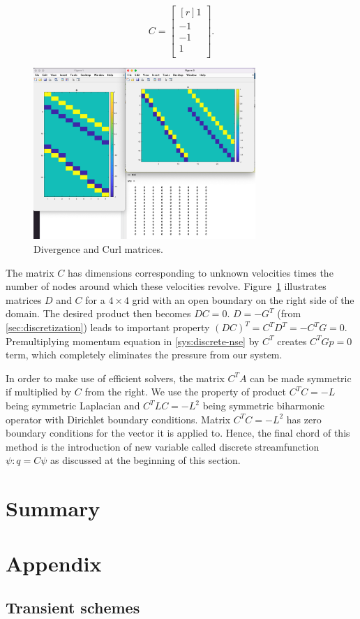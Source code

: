\documentclass{article}
\numberwithin{equation}{section}
\begin{document}
\begin{equation*}
  C = 
  \begin{bmatrix*}[r]
  1		\\
  -1	\\
  -1	\\
  1		\\
\end{bmatrix*}.
\end{equation*}

\begin{figure}[H]
\begin{center}
  \includegraphics[width=0.75\textwidth]{Figures/D-C-DC}
\end{center}
\caption{Divergence and Curl matrices.}
\label{fig:DC}
\end{figure}
The matrix $C$ has dimensions corresponding to unknown velocities times the number of nodes around which these velocities revolve. 
	Figure~\ref{fig:DC} illustrates matrices $D$ and $C$ for a $4\times4$ grid with an open boundary on the right side of the domain. 
The desired product then becomes $DC=0$. 
	$D=-G^T$ (from \cref{sec:discretization}) leads to important property $(DC)^T=C^TD^T=-C^TG=0$. 
	Premultiplying momentum equation in \cref{sys:discrete-nse} by $C^T$ creates $C^TGp=0$ term, which completely eliminates the pressure from our system.

In order to make use of efficient solvers, the matrix $C^TA$ can be made symmetric if multiplied by $C$ from the right. 
	We use the property of product $C^TC=-L$ being symmetric Laplacian and $C^TLC=-L^2$ being symmetric biharmonic operator with Dirichlet boundary conditions. 
	Matrix $C^TC=-L^2$ has zero boundary conditions for the vector it is applied to.
	Hence, the final chord of this method is the introduction of new variable called discrete streamfunction $\psi:q=C\psi$ as discussed at the beginning of this section.


	
\section{Summary}\label{sec:summary}
	

\pagebreak


 

\pagebreak
\appendix
\section{Appendix}

\subsection{Transient schemes}
\end{document}
